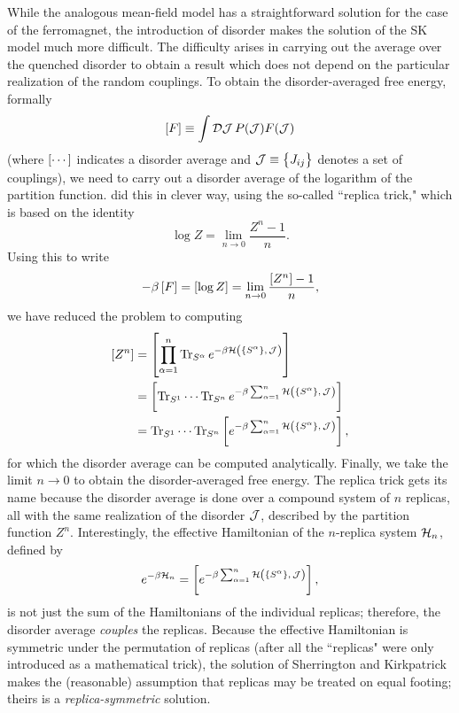 While the analogous mean-field model has a straightforward solution for the
case of the ferromagnet, the introduction of disorder makes the solution of the
SK model much more difficult. The difficulty arises in carrying out the average
over the quenched disorder to obtain a result which does not depend on the
particular realization of the random couplings. To obtain the disorder-averaged
free energy, formally
\begin{equation}
  \left[F\right] \equiv \int \mathcal{D}\mathcal{J} \, P(\mathcal{J}) F(\mathcal{J})
\end{equation}
(where $\left[\cdots\right]$ indicates a disorder average and $\JJ \equiv
\cbr{J_{ij}}$ denotes a set of couplings), we need to carry out a disorder
average of the logarithm of the partition function.
\textcite{sherrington1975solvable} did this in clever way, using the so-called
``replica trick," which is based on the identity
\begin{equation}
  \log Z = \lim_{n \to 0} \frac{Z^n-1}{n}.
\end{equation}
Using this to write
\begin{equation}
  -\beta \left[F\right]
  = \left[\log Z\right]
  = \lim_{n \to 0} \frac{\left[Z^n\right]-1}{n},
\end{equation}
we have reduced the problem to computing
\begin{align*}
  \davc{Z^n}
  &=\davc{\prod_{\alpha=1}^n \Tr_{S^{\alpha}}
    e^{-\beta\ham\del{\cbr{S^{\alpha}},\,\JJ}}} \\
  &=\davc{\Tr_{S^{1}} \cdots \Tr_{S^{n}}
    e^{-\beta\sum_{\alpha=1}^n
    \ham\del{\cbr{S^{\alpha}},\,\JJ}}} \\
  &=\Tr_{S^{1}} \cdots \Tr_{S^{n}}
    \davc{e^{-\beta\sum_{\alpha=1}^n
    \ham\del{\cbr{S^{\alpha}},\,\JJ}}},
\end{align*}
for which the disorder average can be computed analytically. Finally, we take
the limit $n \to 0$ to obtain the disorder-averaged free energy. The replica
trick gets its name because the disorder average is done over a compound system
of $n$ replicas, all with the same realization of the disorder $\mathcal{J}$, described
by the partition function $Z^n$. Interestingly, the effective Hamiltonian of
the $n$-replica system $\mathcal{H}_n$, defined by
\begin{equation}
  e^{-\beta\ham_n} =
  \davc{e^{-\beta\sum_{\alpha=1}^n
  \ham\del{\cbr{S^{\alpha}},\,\JJ}}},
\end{equation}
is not just the sum of the Hamiltonians of the individual replicas; therefore,
the disorder average \emph{couples} the replicas. Because the effective
Hamiltonian is symmetric under the permutation of replicas (after all the
``replicas" were only introduced as a mathematical trick), the solution of
Sherrington and Kirkpatrick makes the (reasonable) assumption that replicas may
be treated on equal footing; theirs is a \emph{replica-symmetric} solution.

